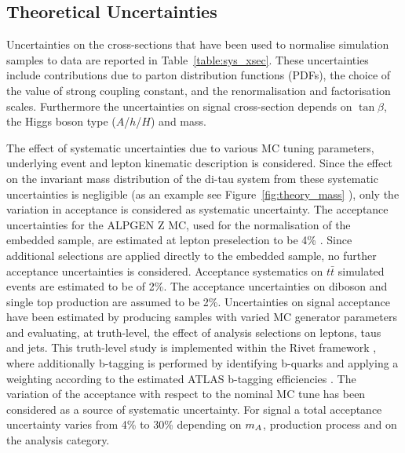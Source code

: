 \subsection{Theoretical Uncertainties}
\label{sec:sys_theory}

Uncertainties on the cross-sections that have been used to normalise
simulation samples to data are reported in
Table~\ref{table:sys_xsec}. These
uncertainties include contributions due to parton distribution
functions (PDFs), the choice of the value of strong coupling constant,
and the renormalisation and factorisation scales.  Furthermore the
uncertainties on signal cross-section depends on $\tan\beta$, the
Higgs boson type ($A$/$h$/$H$) and mass.

The effect of systematic uncertainties due to various MC tuning
parameters, underlying event and
lepton kinematic description is considered.
Since the effect on the invariant mass distribution of the di-tau system from these systematic
uncertainties is negligible (as an example see
Figure~\ref{fig:theory_mass} ), only the variation in
acceptance is considered as systematic uncertainty.
The acceptance uncertainties for the ALPGEN Z MC, used for the normalisation of the embedded sample, 
are estimated at lepton preselection to be 4\% \cite{2010SMLLSupportNote}.
Since additional selections are applied directly to the embedded sample, 
no further acceptance uncertainties is considered. Acceptance systematics on
$t\bar{t}$ simulated events are estimated to be of 2\%. %
The acceptance uncertainties on diboson and single top production are assumed to be 2\%.
Uncertainties on signal acceptance have been estimated
by producing samples with varied MC generator parameters and evaluating, at
truth-level, the effect of analysis selections on leptons, taus and
jets. This truth-level study is implemented within the Rivet framework
\cite{RIVET}, where additionally b-tagging is performed by identifying b-quarks and applying
a weighting according to the estimated ATLAS b-tagging
efficiencies \cite{BtaggingScaleFactors}. The variation of the acceptance
with respect to the nominal MC tune has  been considered as
a source of systematic uncertainty. For signal a total acceptance 
uncertainty varies from 4\% to 30\% depending on $m_{A}$, production process 
and on the analysis category.

